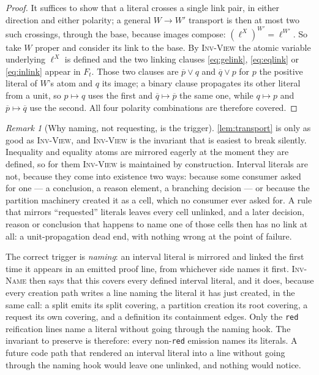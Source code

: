 \documentclass[11pt,a4paper]{article}
\theoremstyle{plain}
\theoremstyle{definition}
\theoremstyle{remark}
\newtheorem{remarkN}{Remark}
\newcommand{\inv}[1]{\textnormal{\textsc{Inv-#1}}}
\newcommand{\code}[1]{\texttt{#1}}
\newcommand{\invView}{\inv{View}}
\newcommand{\invName}{\inv{Name}}
\begin{document}
\begin{proof}
It suffices to show that a literal crosses a single link pair, in either
direction and either polarity; a general $W\to W'$ transport is then at most two
such crossings, through the base, because images compose:
$(\ell^{X})^{W'} = \ell^{W'}$.  So take $W$ proper and consider its link to the
base.  By \invView{} the atomic variable underlying $\ell^{X}$ is defined and the
two linking clauses
\cref{eq:gelink}, \cref{eq:eqlink} or \cref{eq:inlink} appear in $F_t$.  Those
two clauses are $\overline{p}\vee q$ and $\overline{q}\vee p$ for
$p$ the positive literal of $W$'s atom and $q$ its image; a binary clause
propagates its other literal from a unit, so $p\mapsto q$ uses the first and
$\overline{q}\mapsto\overline{p}$ the same one, while $q\mapsto p$ and
$\overline{p}\mapsto\overline{q}$ use the second.  All four polarity
combinations are therefore covered.
\end{proof}

\begin{remarkN}[Why naming, not requesting, is the trigger]
\label{rem:naming}
\cref{lem:transport} is only as good as \invView{}, and \invView{} is the
invariant that is easiest to break silently.  Inequality and equality atoms are
mirrored eagerly at the moment they are defined, so for them \invView{} is
maintained by construction.  Interval literals are not, because they come into
existence two ways: because some consumer asked for one --- a conclusion, a
reason element, a branching decision --- or because the partition machinery
created it as a cell, which no consumer ever asked for.  A rule that mirrors
``requested'' literals leaves every cell unlinked, and a later decision, reason
or conclusion that happens to name one of those cells then has no link at all:
a unit-propagation dead end, with nothing wrong at the point of failure.

The correct trigger is \emph{naming}: an interval literal is mirrored and linked
the first time it appears in an emitted proof line, from whichever side names it
first.  \invName{} then says that this covers every defined interval literal,
and it does, because every creation path writes a line naming the literal it has
just created, in the same call: a split emits its split covering, a partition
creation its root covering, a request its own covering, and a definition its
containment edges.  Only the \code{red} reification lines name a literal without
going through the naming hook.  The invariant to preserve is therefore: every
non-\code{red} emission names its literals.  A future code path that rendered an
interval literal into a line without going through the naming hook would leave
one unlinked, and nothing would notice.
\end{remarkN}
\end{document}
